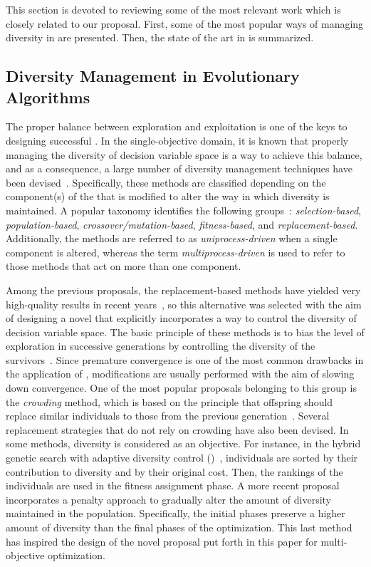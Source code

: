 This section is devoted to reviewing some of the most relevant work which is closely related to our proposal.
%
First, some of the most popular ways of managing diversity in \EAS{} are presented.
%
Then, the state of the art in \MOEAS{} is summarized.

\subsection{Diversity Management in Evolutionary Algorithms}

The proper balance between exploration and exploitation is one of the keys to designing successful \EAS{}.
%
In the single-objective domain, it is known that properly managing the diversity of decision 
variable space is a way to achieve this balance,
and as a consequence, a large number of diversity management techniques have been devised~\cite{Mohan:14}.
%
Specifically, these methods are classified depending on the component(s) of the \EA{} that is modified to alter the way in which 
diversity is maintained.
%
A popular taxonomy identifies the following groups~\cite{Joel:Crepinsek}: \textit{selection-based}, \textit{population-based}, 
\textit{crossover/mutation-based}, \textit{fitness-based}, and \textit{replacement-based}.
%
Additionally, the methods are referred to as \textit{uniprocess-driven} when a single component is altered, whereas the term
\textit{multiprocess-driven} is used to refer to those methods that act on more than one component.

Among the previous proposals, the replacement-based methods have yielded very high-quality results in recent years~\cite{Segura:17}, so
this alternative was selected with the aim of designing a novel \MOEA{} that explicitly incorporates a way to control the diversity 
of decision variable space.
%
The basic principle of these methods is to bias the level of exploration in successive generations by 
controlling the diversity of the survivors~\cite{Segura:17}.
%
Since premature convergence is one of the most common drawbacks in the application of \EAS{}, 
modifications are usually performed with the aim of slowing down convergence.
%
One of the most popular proposals belonging to this group is the \textit{crowding} method, which
is based on the principle that offspring should replace similar individuals to those from the previous generation~\cite{Mengshoel:14}.
%
Several replacement strategies that do not rely on crowding have also been devised.
%
In some methods, diversity is considered as an objective.
%
For instance, in the hybrid genetic search with adaptive diversity control (\HGSADC{})~\cite{Vidal:13}, individuals are sorted 
by their contribution to diversity and by their original cost.
%
Then, the rankings of the individuals are used in the fitness assignment phase.
%
A more recent proposal~\cite{Segura:17} incorporates a penalty approach to gradually alter the amount of diversity 
maintained in the population.
%
Specifically, the initial phases preserve a higher amount of diversity than the final phases of the optimization.
%
This last method has inspired the design of the novel proposal put forth in this paper for multi-objective optimization.
%

